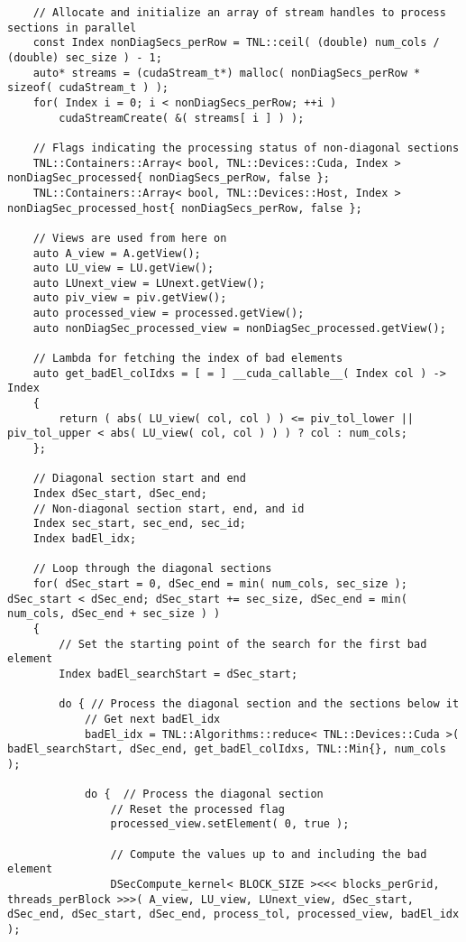 \begin{lstlisting}
	// Allocate and initialize an array of stream handles to process sections in parallel
	const Index nonDiagSecs_perRow = TNL::ceil( (double) num_cols / (double) sec_size ) - 1;
	auto* streams = (cudaStream_t*) malloc( nonDiagSecs_perRow * sizeof( cudaStream_t ) );
	for( Index i = 0; i < nonDiagSecs_perRow; ++i )
		cudaStreamCreate( &( streams[ i ] ) );
	
	// Flags indicating the processing status of non-diagonal sections
	TNL::Containers::Array< bool, TNL::Devices::Cuda, Index > nonDiagSec_processed{ nonDiagSecs_perRow, false };
	TNL::Containers::Array< bool, TNL::Devices::Host, Index > nonDiagSec_processed_host{ nonDiagSecs_perRow, false };
	
	// Views are used from here on
	auto A_view = A.getView();
	auto LU_view = LU.getView();
	auto LUnext_view = LUnext.getView();
	auto piv_view = piv.getView();
	auto processed_view = processed.getView();
	auto nonDiagSec_processed_view = nonDiagSec_processed.getView();
	
	// Lambda for fetching the index of bad elements
	auto get_badEl_colIdxs = [ = ] __cuda_callable__( Index col ) -> Index
	{
		return ( abs( LU_view( col, col ) ) <= piv_tol_lower || piv_tol_upper < abs( LU_view( col, col ) ) ) ? col : num_cols;
	};
	
	// Diagonal section start and end
	Index dSec_start, dSec_end;
	// Non-diagonal section start, end, and id
	Index sec_start, sec_end, sec_id;
	Index badEl_idx;
	
	// Loop through the diagonal sections
	for( dSec_start = 0, dSec_end = min( num_cols, sec_size ); dSec_start < dSec_end; dSec_start += sec_size, dSec_end = min( num_cols, dSec_end + sec_size ) )
	{
		// Set the starting point of the search for the first bad element
		Index badEl_searchStart = dSec_start;
		
		do { // Process the diagonal section and the sections below it
			// Get next badEl_idx
			badEl_idx = TNL::Algorithms::reduce< TNL::Devices::Cuda >( badEl_searchStart, dSec_end, get_badEl_colIdxs, TNL::Min{}, num_cols );
			
			do {  // Process the diagonal section
				// Reset the processed flag
				processed_view.setElement( 0, true );
				
				// Compute the values up to and including the bad element
				DSecCompute_kernel< BLOCK_SIZE ><<< blocks_perGrid, threads_perBlock >>>( A_view, LU_view, LUnext_view, dSec_start, dSec_end, dSec_start, dSec_end, process_tol, processed_view, badEl_idx );
				

\end{lstlisting}
